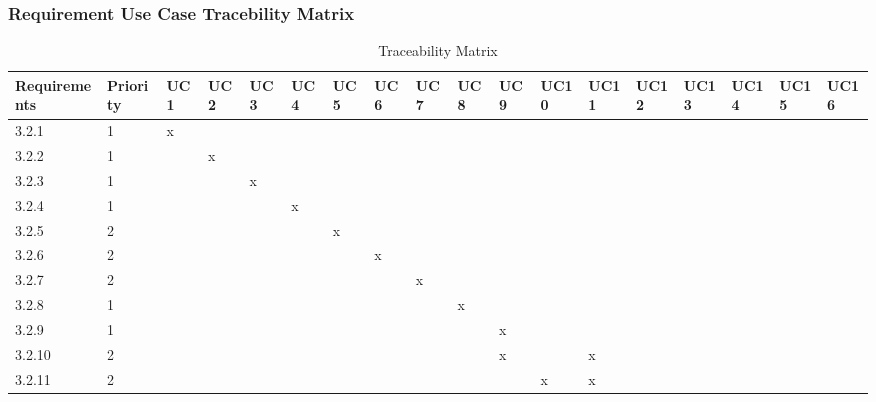 \documentclass[runningheads,a4paper]{article}
\begin{document}
\subsubsection{Requirement Use Case Tracebility Matrix}
\begin{table}[]
\centering
\begin{adjustbox}{width=1\textwidth}
\caption{Traceability Matrix}
\label{my-label}
\begin{tabular}{|l|l|l|l|l|l|l|l|l|l|l|l|l|l|l|l|l|l|}
\hline
Requirements      & Priority      & UC1 & UC2 & UC3 & UC4 & UC5 & UC6 & UC7 & UC8 & UC9 & UC10 & UC11 & UC12 & UC13 & UC14 & UC15 & UC16 \\ \hline
3.2.1             & 1             & x   &     &     &     &     &     &     &     &     &      &      &      &      &      &      &      \\ \hline
3.2.2             & 1             &     & x   &     &     &     &     &     &     &     &      &      &      &      &      &      &      \\ \hline
3.2.3             & 1             &     &     & x   &     &     &     &     &     &     &      &      &      &      &      &      &      \\ \hline
3.2.4             & 1             &     &     &     & x   &     &     &     &     &     &      &      &      &      &      &      &      \\ \hline
3.2.5             & 2             &     &     &     &     & x   &     &     &     &     &      &      &      &      &      &      &      \\ \hline
3.2.6             & 2             &     &     &     &     &     & x   &     &     &     &      &      &      &      &      &      &      \\ \hline
3.2.7             & 2             &     &     &     &     &     &     & x   &     &     &      &      &      &      &      &      &      \\ \hline
3.2.8             & 1             &     &     &     &     &     &     &     & x   &     &      &      &      &      &      &      &      \\ \hline
3.2.9             & 1             &     &     &     &     &     &     &     &     & x   &      &      &      &      &      &      &      \\ \hline
3.2.10            & 2             &     &     &     &     &     &     &     &     & x   &      & x    &      &      &      &      &      \\ \hline
3.2.11            & 2             &     &     &     &     &     &     &     &     &     & x    & x    &      &      &      &      &      \\ \hline

\end{tabular}
\end{adjustbox}
\end{table}
\end{document}
